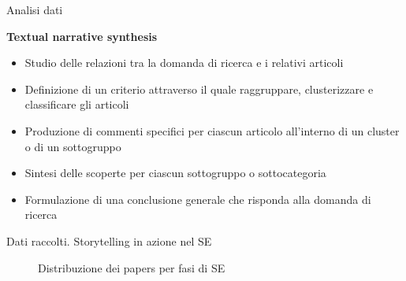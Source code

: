 \documentclass{beamer}
\begin{document}
\begin{frame}[t]{\centerline{Analisi dati}}

  \centering
  {\fontsize{16}{22}\textbf{\textcolor{myyellow}{Textual narrative synthesis  \cite{Lucas2007}}}}
\vspace{1cm}
  \begin{itemize}
      \item Studio delle relazioni tra la domanda di ricerca e i relativi articoli
\item Definizione di un criterio attraverso il quale raggruppare, clusterizzare e classificare gli articoli
\item Produzione di commenti specifici per ciascun articolo all'interno di un cluster o di un sottogruppo
\item Sintesi delle scoperte per ciascun sottogruppo o sottocategoria
\item Formulazione di una conclusione generale che risponda alla domanda di ricerca
  \end{itemize}


\end{frame}
\begin{frame}[t]{\centerline{Dati raccolti. Storytelling in azione nel SE}}
\begin{figure}[htbp]
    \centering
    \caption{Distribuzione dei papers per fasi di SE}
    \label{fig:distribution}
\end{figure}
\end{frame}
\end{document}
